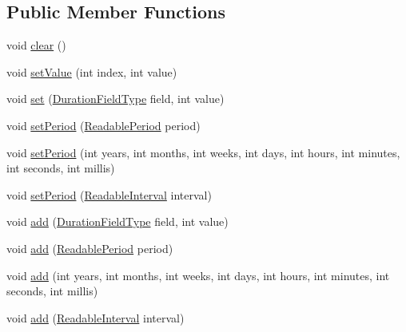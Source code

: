 \subsection*{Public Member Functions}
\begin{DoxyCompactItemize}
\item 
void \hyperlink{interfaceorg_1_1joda_1_1time_1_1_read_writable_period_a47d2dbf31d664f8dc16f1f135636a2f7}{clear} ()
\item 
void \hyperlink{interfaceorg_1_1joda_1_1time_1_1_read_writable_period_ad1f509a83238c0f1681242060530388a}{set\-Value} (int index, int value)
\item 
void \hyperlink{interfaceorg_1_1joda_1_1time_1_1_read_writable_period_a40f6c7eadb2edffba5a3f4ad03d50c98}{set} (\hyperlink{classorg_1_1joda_1_1time_1_1_duration_field_type}{Duration\-Field\-Type} field, int value)
\item 
void \hyperlink{interfaceorg_1_1joda_1_1time_1_1_read_writable_period_a85e17ee2e131fc757357875602c53b14}{set\-Period} (\hyperlink{interfaceorg_1_1joda_1_1time_1_1_readable_period}{Readable\-Period} period)
\item 
void \hyperlink{interfaceorg_1_1joda_1_1time_1_1_read_writable_period_a5ec49e4fde35a81a6a9beaf6a31311f2}{set\-Period} (int years, int months, int weeks, int days, int hours, int minutes, int seconds, int millis)
\item 
void \hyperlink{interfaceorg_1_1joda_1_1time_1_1_read_writable_period_a6ec0d2cb77b4c0c9a5e4fdc05aa5b7e6}{set\-Period} (\hyperlink{interfaceorg_1_1joda_1_1time_1_1_readable_interval}{Readable\-Interval} interval)
\item 
void \hyperlink{interfaceorg_1_1joda_1_1time_1_1_read_writable_period_a4d30236671fef93b0e740d534d0cbe88}{add} (\hyperlink{classorg_1_1joda_1_1time_1_1_duration_field_type}{Duration\-Field\-Type} field, int value)
\item 
void \hyperlink{interfaceorg_1_1joda_1_1time_1_1_read_writable_period_a8b3acdd3670a622849652f6e13fc8bdb}{add} (\hyperlink{interfaceorg_1_1joda_1_1time_1_1_readable_period}{Readable\-Period} period)
\item 
void \hyperlink{interfaceorg_1_1joda_1_1time_1_1_read_writable_period_aa71ec0111e5bc675ca31b93aa07d6e49}{add} (int years, int months, int weeks, int days, int hours, int minutes, int seconds, int millis)
\item 
void \hyperlink{interfaceorg_1_1joda_1_1time_1_1_read_writable_period_acebb86612b85f8cd6e4c581bc2fc918b}{add} (\hyperlink{interfaceorg_1_1joda_1_1time_1_1_readable_interval}{Readable\-Interval} interval)

\end{DoxyCompactItemize}
